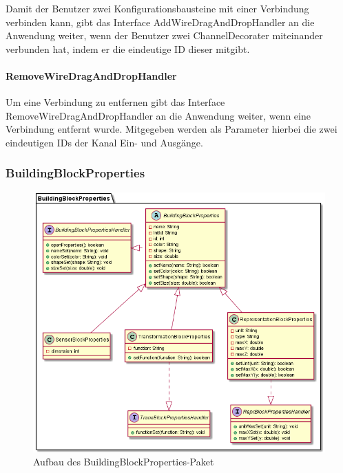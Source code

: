 \documentclass[parskip=full]{scrartcl}
\begin{document}
Damit der Benutzer zwei Konfigurationsbausteine mit einer Verbindung verbinden kann, gibt das Interface AddWireDragAndDropHandler an die Anwendung weiter, wenn der Benutzer zwei ChannelDecorater miteinander verbunden hat, indem er die eindeutige ID dieser mitgibt.

\paragraph{RemoveWireDragAndDropHandler}

Um eine Verbindung zu entfernen gibt das Interface RemoveWireDragAndDropHandler an die Anwendung weiter, wenn eine Verbindung entfernt wurde. Mitgegeben werden als Parameter hierbei die zwei eindeutigen IDs der Kanal Ein- und Ausgänge.

\newpage 

\subsubsection{BuildingBlockProperties}

\begin{figure}[htbp]
	\begin{center}
		\includegraphics[width = 14cm]{Grafiken/View/BuildingBlockPropertiesNamespace.png}
		\caption{Aufbau des BuildingBlockProperties-Paket}
		\label{Entwurf_Grob}
	\end{center}
\end{figure}
\end{document}
